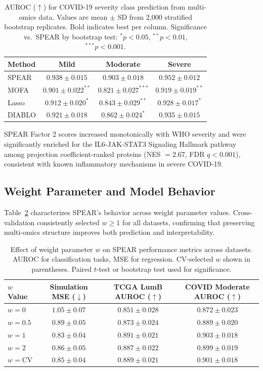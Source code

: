 \documentclass[11pt]{article}
\begin{document}
\begin{table}[H]
\centering
\caption{AUROC ($\uparrow$) for COVID-19 severity class prediction from multi-omics data. Values are mean $\pm$ SD from 2{,}000 stratified bootstrap replicates. Bold indicates best per column. Significance vs.\ SPEAR by bootstrap test: $^*p<0.05$, $^{**}p<0.01$, $^{***}p<0.001$.}
\label{tab:covid_auroc}
\begin{tabular}{lccc}
\toprule
Method & Mild & Moderate & Severe \\
\midrule
SPEAR & $\mathbf{0.938 \pm 0.015}$ & $\mathbf{0.903 \pm 0.018}$ & $\mathbf{0.952 \pm 0.012}$ \\
MOFA & $0.901 \pm 0.022^{**}$ & $0.821 \pm 0.027^{***}$ & $0.919 \pm 0.019^{**}$ \\
Lasso & $0.912 \pm 0.020^{*}$ & $0.843 \pm 0.029^{**}$ & $0.928 \pm 0.017^{*}$ \\
DIABLO & $0.921 \pm 0.018$ & $0.862 \pm 0.024^{*}$ & $0.935 \pm 0.015$ \\
\bottomrule
\end{tabular}
\end{table}

SPEAR Factor 2 scores increased monotonically with WHO severity and were significantly enriched for the IL6-JAK-STAT3 Signaling Hallmark pathway among projection coefficient-ranked proteins (NES $= 2.67$, FDR $q < 0.001$), consistent with known inflammatory mechanisms in severe COVID-19.

\subsection{Weight Parameter and Model Behavior}

Table~\ref{tab:weight_analysis} characterizes SPEAR's behavior across weight parameter values. Cross-validation consistently selected $w \geq 1$ for all datasets, confirming that preserving multi-omics structure improves both prediction and interpretability.

\begin{table}[H]
\centering
\caption{Effect of weight parameter $w$ on SPEAR performance metrics across datasets. AUROC for classification tasks, MSE for regression. CV-selected $w$ shown in parentheses. Paired $t$-test or bootstrap test used for significance.}
\label{tab:weight_analysis}
\begin{tabular}{lccc}
\toprule
$w$ Value & Simulation MSE ($\downarrow$) & TCGA LumB AUROC ($\uparrow$) & COVID Moderate AUROC ($\uparrow$) \\
\midrule
$w = 0$ & $1.05 \pm 0.07$ & $0.851 \pm 0.028$ & $0.872 \pm 0.023$ \\
$w = 0.5$ & $0.89 \pm 0.05$ & $0.873 \pm 0.024$ & $0.889 \pm 0.020$ \\
$w = 1$ & $\mathbf{0.83 \pm 0.04}$ & $\mathbf{0.891 \pm 0.021}$ & $\mathbf{0.903 \pm 0.018}$ \\
$w = 2$ & $0.86 \pm 0.05$ & $0.887 \pm 0.022$ & $0.899 \pm 0.019$ \\
$w = \text{CV}$ & $0.85 \pm 0.04$ & $0.889 \pm 0.021$ & $0.901 \pm 0.018$ \\
\bottomrule
\end{tabular}
\end{table}
\end{document}
